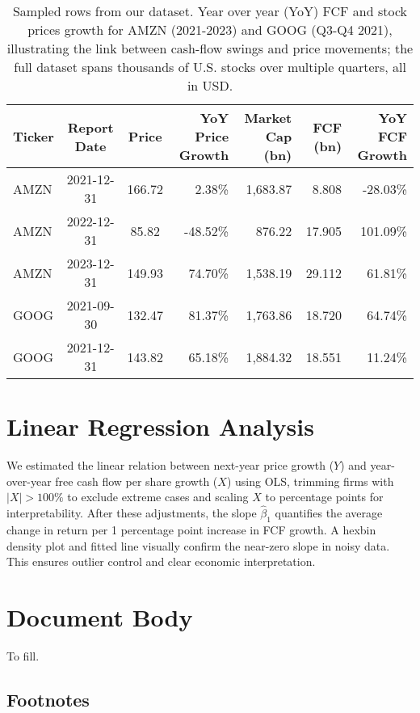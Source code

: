 \documentclass[11pt]{article}
\begin{document}
\begin{table*}[h]
  \setlength{\tabcolsep}{4pt}
  \centering
\caption{Sampled rows from our dataset. Year over year (YoY) FCF and stock prices growth for AMZN (2021-2023) and GOOG (Q3-Q4 2021), illustrating the link between cash-flow swings and price movements; the full dataset spans thousands of U.S. stocks over multiple quarters, all in USD.}
  \label{tab:sample-data}
  \begin{tabular}{lccrrrr}
    \toprule
    Ticker & Report Date & Price & YoY Price Growth & Market Cap (bn) & FCF (bn) & YoY FCF Growth \\
    \midrule
    AMZN & 2021-12-31 & 166.72 & 2.38\%   & 1,683.87 &  8.808 &  -28.03\% \\
    AMZN & 2022-12-31 &  85.82 & -48.52\% &   876.22 & 17.905 &  101.09\% \\
    AMZN & 2023-12-31 & 149.93 & 74.70\%  & 1,538.19 & 29.112 &   61.81\% \\
    \midrule
    GOOG & 2021-09-30 & 132.47 & 81.37\%  & 1,763.86 & 18.720 &   64.74\% \\
    GOOG & 2021-12-31 & 143.82 & 65.18\%  & 1,884.32 & 18.551 &   11.24\% \\
    \bottomrule
  \end{tabular}
\end{table*}

\section{Linear Regression Analysis}

We estimated the linear relation between next-year price growth ($Y$) and year-over-year free cash flow per share growth ($X$) using OLS, trimming firms with $|X|>100\%$ to exclude extreme cases and scaling $X$ to percentage points for interpretability. After these adjustments, the slope $\hat\beta_1$ quantifies the average change in return per 1 percentage point increase in FCF growth. A hexbin density plot and fitted line visually confirm the near-zero slope in noisy data. This ensures outlier control and clear economic interpretation.

\section{Document Body}

To fill.

\subsection{Footnotes}
\end{document}
